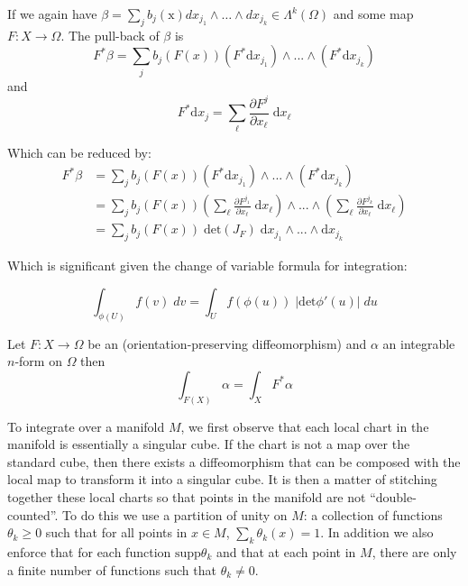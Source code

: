 

If we again have $\beta = \sum_j b_j(\text{x}) dx_{j_1} \wedge \ldots \wedge dx_{j_k} \in \Lambda^k(\Omega)$
and some  map $F: X \to \Omega$.
The pull-back of $\beta$ is
\begin{equation}
F^* \beta = \sum_j  b_j ( F(x)) (F^* \text{d}x_{j_1}) \wedge ... \wedge (F^* \text{d} x_{j_k})
\end{equation}
and
\begin{equation}
F^* \text{d}x_j = \sum_\ell \frac{\partial F^j}{\partial x_\ell} \; \text{d} x_\ell
\end{equation}

Which can be reduced by:
\begin{align}
F^ * \beta & = \sum_j  b_j ( F(x)) (F^* \text{d}x_{j_1}) \wedge ... \wedge (F^* \text{d} x_{j_k}) \\
& = \sum_j  b_j ( F(x))  
\left( \sum_\ell \frac{\partial F^{j_1}}{\partial x_\ell} \; \text{d} x_\ell \right)
\wedge ... \wedge  
\left( \sum_\ell \frac{\partial F^{j_k}}{\partial x_\ell} \; \text{d} x_\ell \right) \\
& = \sum_j b_j ( F(x)) \; \text{det}\left( J_F \right) \; \text{d}x_{j_1} \wedge ... \wedge \text{d} x_{j_k}
\end{align}

Which is significant given the change of variable formula for integration:

\begin{equation}
\int_{\phi(U)} \! f(v) \; dv = \int_U \! f(\phi(u)) \; |\text{det}\phi'(u)| \; du
\end{equation}

\begin{theorem}
Let $F : X  \to \Omega$ be an (orientation-preserving diffeomorphism) and $\alpha$ an integrable $n$-form on $\Omega$ then
\begin{equation}
\int_{F(X)} \alpha = \int_X F^* \alpha
\end{equation}
\end{theorem}




To integrate over a manifold $M$, we first observe that each local chart in the manifold is essentially a singular cube.
If the chart is not a map over the standard cube, then there exists a diffeomorphism 
that can be composed with the local map to transform it into a singular cube.
It is then a matter of stitching together these local charts so that points in the manifold are not ``double-counted''.
To do this we use a partition of unity on $M$: a collection of functions $\theta_k \geq 0$ such that 
for all points in $x \in M$, $\sum_k \theta_k(x) = 1$.
In addition we also enforce that for each function $\text{supp} \theta_k$ and that at each point in $M$, there are only
a finite number of functions such that $\theta_k \neq 0$.

